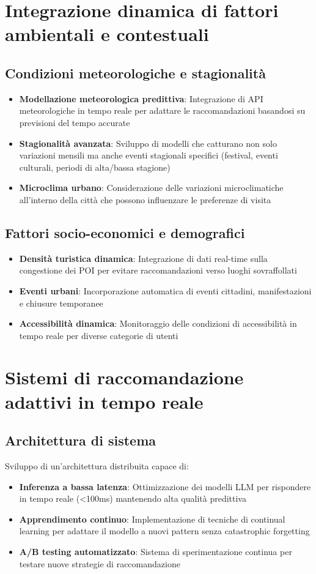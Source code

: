\section{Integrazione dinamica di fattori ambientali e contestuali}

\subsection{Condizioni meteorologiche e stagionalità}
\begin{itemize}
\item \textbf{Modellazione meteorologica predittiva}: Integrazione di API meteorologiche in tempo reale per adattare le raccomandazioni basandosi su previsioni del tempo accurate
\item \textbf{Stagionalità avanzata}: Sviluppo di modelli che catturano non solo variazioni mensili ma anche eventi stagionali specifici (festival, eventi culturali, periodi di alta/bassa stagione)
\item \textbf{Microclima urbano}: Considerazione delle variazioni microclimatiche all'interno della città che possono influenzare le preferenze di visita
\end{itemize}

\subsection{Fattori socio-economici e demografici}
\begin{itemize}
\item \textbf{Densità turistica dinamica}: Integrazione di dati real-time sulla congestione dei POI per evitare raccomandazioni verso luoghi sovraffollati
\item \textbf{Eventi urbani}: Incorporazione automatica di eventi cittadini, manifestazioni e chiusure temporanee
\item \textbf{Accessibilità dinamica}: Monitoraggio delle condizioni di accessibilità in tempo reale per diverse categorie di utenti
\end{itemize}

\section{Sistemi di raccomandazione adattivi in tempo reale}

\subsection{Architettura di sistema}
Sviluppo di un'architettura distribuita capace di:
\begin{itemize}
\item \textbf{Inferenza a bassa latenza}: Ottimizzazione dei modelli LLM per rispondere in tempo reale (<100ms) mantenendo alta qualità predittiva
\item \textbf{Apprendimento continuo}: Implementazione di tecniche di continual learning per adattare il modello a nuovi pattern senza catastrophic forgetting
\item \textbf{A/B testing automatizzato}: Sistema di sperimentazione continua per testare nuove strategie di raccomandazione
\end{itemize}


